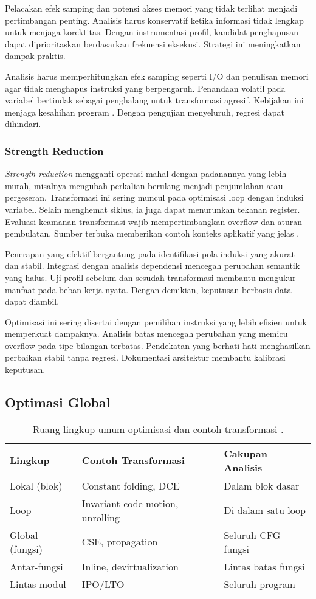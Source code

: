 \documentclass[../main.tex]{subfiles}
\begin{document}
Pelacakan efek samping dan potensi akses memori yang tidak terlihat menjadi pertimbangan penting. Analisis harus konservatif ketika informasi tidak lengkap untuk menjaga korektitas. Dengan instrumentasi profil, kandidat penghapusan dapat diprioritaskan berdasarkan frekuensi eksekusi. Strategi ini meningkatkan dampak praktis.

Analisis harus memperhitungkan efek samping seperti I/O dan penulisan memori agar tidak menghapus instruksi yang berpengaruh. Penandaan volatil pada variabel bertindak sebagai penghalang untuk transformasi agresif. Kebijakan ini menjaga kesahihan program \citep{WikiDCE}. Dengan pengujian menyeluruh, regresi dapat dihindari.

\subsubsection{Strength Reduction}
\emph{Strength reduction} mengganti operasi mahal dengan padanannya yang lebih murah, misalnya mengubah perkalian berulang menjadi penjumlahan atau pergeseran. Transformasi ini sering muncul pada optimisasi loop dengan induksi variabel. Selain menghemat siklus, ia juga dapat menurunkan tekanan register. Evaluasi keamanan transformasi wajib mempertimbangkan overflow dan aturan pembulatan. Sumber terbuka memberikan contoh konteks aplikatif yang jelas \citep{WikiStrengthReduction}.

Penerapan yang efektif bergantung pada identifikasi pola induksi yang akurat dan stabil. Integrasi dengan analisis dependensi mencegah perubahan semantik yang halus. Uji profil sebelum dan sesudah transformasi membantu mengukur manfaat pada beban kerja nyata. Dengan demikian, keputusan berbasis data dapat diambil.

Optimisasi ini sering disertai dengan pemilihan instruksi yang lebih efisien untuk memperkuat dampaknya. Analisis batas mencegah perubahan yang memicu overflow pada tipe bilangan terbatas. Pendekatan yang berhati-hati menghasilkan perbaikan stabil tanpa regresi. Dokumentasi arsitektur membantu kalibrasi keputusan.

\subsection{Optimasi Global}
\begin{table}[t]
  \centering
  \caption{Ruang lingkup umum optimisasi dan contoh transformasi \citep{WikiOptimization}.}
  \label{tab:opt-scope}
  \begin{tabular}{@{}lll@{}}
    \toprule
    Lingkup & Contoh Transformasi & Cakupan Analisis \\
    \midrule
    Lokal (blok) & Constant folding, DCE & Dalam blok dasar \\
    Loop & Invariant code motion, unrolling & Di dalam satu loop \\
    Global (fungsi) & CSE, propagation & Seluruh CFG fungsi \\
    Antar-fungsi & Inline, devirtualization & Lintas batas fungsi \\
    Lintas modul & IPO/LTO & Seluruh program \\
    \bottomrule
  \end{tabular}
\end{table}
\end{document}
